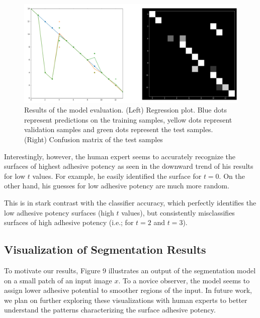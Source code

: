 \documentclass[10pt,twocolumn,letterpaper]{article}
\begin{document}
\begin{figure}[h]
\centering
\includegraphics[width=0.9\linewidth]{"./figures/Figure8"}
\caption{
Results of the model evaluation.
(Left) Regression plot. 
Blue dots represent predictions on the training samples, 
yellow dots represent validation samples and green dots represent the test samples.
(Right) Confusion matrix of the test samples
}
\end{figure}

Interestingly, however, the human expert seems to accurately recognize 
the surfaces of highest adhesive potency as seen in the downward trend of his results 
for low $t$ values. For example, he easily identified the surface for $t=0$.
On the other hand, his guesses for low adhesive potency are much more random.

This is in stark contrast with the classifier accuracy, which perfectly identifies
the low adhesive potency surfaces (high $t$ values), but consistently misclassifies 
surfaces of high adhesive potency (i.e.; for $t=2$ and $t=3$).

\subsection{Visualization of Segmentation Results}

To motivate our results, Figure 9 illustrates an output of the segmentation model on a small patch of an input image $x$.
To a novice observer, the model seems to assign lower adhesive potential to smoother regions of the input.
In future work, we plan on further exploring these visualizations with human experts to better understand the 
patterns characterizing the surface adhesive potency.
\end{document}
